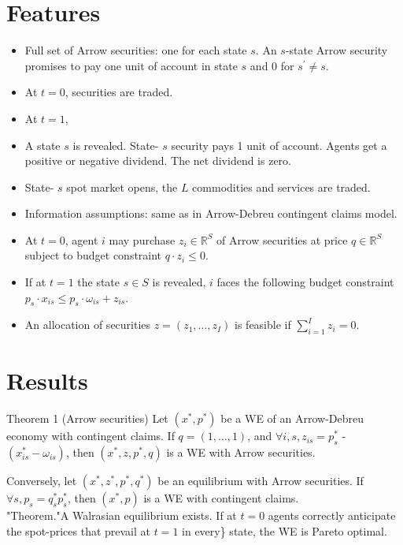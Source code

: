 \documentclass[10pt]{article}
\begin{document}
\section*{Features}
\begin{itemize}
  \item Full set of Arrow securities: one for each state $s$. An $s$-state Arrow security promises to pay one unit of account in state $s$ and 0 for $s^{\prime} \neq s$.
  \item At $t=0$, securities are traded.
  \item At $t=1$,
  \item A state $s$ is revealed. State- $s$ security pays 1 unit of account. Agents get a positive or negative dividend. The net dividend is zero.
  \item State- $s$ spot market opens, the $L$ commodities and services are traded.
  \item Information assumptions: same as in Arrow-Debreu contingent claims model.
  \item At $t=0$, agent $i$ may purchase $z_{i} \in \mathbb{R}^{S}$ of Arrow securities at price $q \in \mathbb{R}^{S}$ subject to budget constraint $q \cdot z_{i} \leq 0$.
  \item If at $t=1$ the state $s \in S$ is revealed, $i$ faces the following budget constraint $p_{s} \cdot x_{i s} \leq p_{s} \cdot \omega_{i s}+z_{i s}$.
  \item An allocation of securities $z=\left(z_{1}, \ldots, z_{I}\right)$ is feasible if $\sum_{i=1}^{I} z_{i}=0$.
\end{itemize}

\section*{Results}
Theorem 1 (Arrow securities) Let $\left(x^{*}, p^{*}\right)$ be a WE of an Arrow-Debreu economy with contingent claims. If $q=(1, \ldots, 1)$, and $\forall i, s, z_{i s}=p_{s}^{*}$ - $\left(x_{i s}^{*}-\omega_{i s}\right)$, then $\left(x^{*}, z, p^{*}, q\right)$ is a WE with Arrow securities.

Conversely, let $\left(x^{*}, z^{*}, p^{*}, q^{*}\right)$ be an equilibrium with Arrow securities. If $\forall s, p_{s}=q_{s}^{*} p_{s}^{*}$, then $\left(x^{*}, p\right)$ is a WE with contingent claims.\\
"Theorem."A Walrasian equilibrium exists. If at $t=0$ agents correctly anticipate the spot-prices that prevail at $t=1$ in every\} state, the WE is Pareto optimal.
\end{document}
